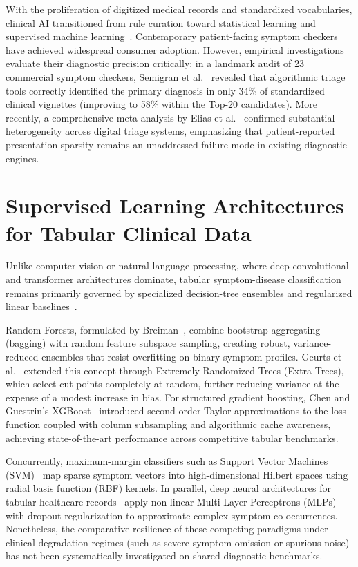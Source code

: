 With the proliferation of digitized medical records and standardized vocabularies, clinical AI transitioned from rule curation toward statistical learning and supervised machine learning~\cite{shickel2017deep}. Contemporary patient-facing symptom checkers have achieved widespread consumer adoption. However, empirical investigations evaluate their diagnostic precision critically: in a landmark audit of 23 commercial symptom checkers, Semigran et al.~\cite{semigran2015evaluation} revealed that algorithmic triage tools correctly identified the primary diagnosis in only 34\% of standardized clinical vignettes (improving to 58\% within the Top-20 candidates). More recently, a comprehensive meta-analysis by Elias et al.~\cite{elias2021diagnostic} confirmed substantial heterogeneity across digital triage systems, emphasizing that patient-reported presentation sparsity remains an unaddressed failure mode in existing diagnostic engines.

\section{Supervised Learning Architectures for Tabular Clinical Data}
\label{sec:supervised_architectures}

Unlike computer vision or natural language processing, where deep convolutional and transformer architectures dominate, tabular symptom-disease classification remains primarily governed by specialized decision-tree ensembles and regularized linear baselines~\cite{pedregosa2011scikit}.

Random Forests, formulated by Breiman~\cite{breiman2001random}, combine bootstrap aggregating (bagging) with random feature subspace sampling, creating robust, variance-reduced ensembles that resist overfitting on binary symptom profiles. Geurts et al.~\cite{geurts2006extremely} extended this concept through Extremely Randomized Trees (Extra Trees), which select cut-points completely at random, further reducing variance at the expense of a modest increase in bias. For structured gradient boosting, Chen and Guestrin's XGBoost~\cite{chen2016xgboost} introduced second-order Taylor approximations to the loss function coupled with column subsampling and algorithmic cache awareness, achieving state-of-the-art performance across competitive tabular benchmarks.

Concurrently, maximum-margin classifiers such as Support Vector Machines (SVM)~\cite{cortes1995support} map sparse symptom vectors into high-dimensional Hilbert spaces using radial basis function (RBF) kernels. In parallel, deep neural architectures for tabular healthcare records~\cite{shickel2017deep} apply non-linear Multi-Layer Perceptrons (MLPs) with dropout regularization to approximate complex symptom co-occurrences. Nonetheless, the comparative resilience of these competing paradigms under clinical degradation regimes (such as severe symptom omission or spurious noise) has not been systematically investigated on shared diagnostic benchmarks.

